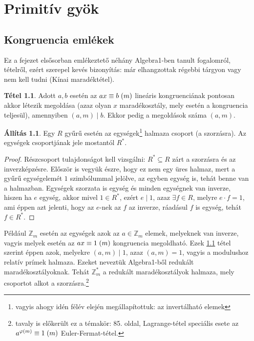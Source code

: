 \documentclass[12pt]{book}
\theoremstyle{plain} %
\theoremstyle{definition} %
\newtheorem{all/}{Állítás}[section]
\newenvironment{all}
{\renewcommand{\qedsymbol}{$\clubsuit$}%
	\pushQED{\qed}\begin{all/}}
	{\popQED\end{all/}}
\newtheorem{theo/}{Tétel}[section]
\newenvironment{theo}
  {\renewcommand{\qedsymbol}{$\clubsuit$}%
   \pushQED{\qed}\begin{theo/}}
  {\popQED\end{theo/}}
\theoremstyle{remark}
\renewcommand\qedsymbol{$\blacksquare$}
\numberwithin{equation}{section}  %
\begin{document}
	\chapter{Primitív gyök}
	\section{Kongruencia emlékek}\label{kongruencia_emlekek}
	Ez a fejezet elsősorban emlékeztető néhány Algebra1-ben tanult fogalomról, tételről, ezért szerepel kevés bizonyítás: már elhangzottak régebbi tárgyon vagy nem kell tudni (Kínai maradéktétel).
	
	\begin{theo}\label{linkongr}
		Adott $a,b$ esetén az $ax\equiv b \hspace{1mm} (m)$ lineáris kongruenciának pontosan akkor létezik megoldása (azaz olyan $x$ maradékosztály, mely esetén a kongruencia teljesül), amennyiben $(a,m)\mid b$. Ekkor pedig a megoldások száma $(a,m)$.
	\end{theo}

	\begin{all}
		Egy $R$ gyűrű esetén az egységek\footnote{vagyis ahogy idén félév elején megállapítottuk: az invertálható elemek} halmaza csoport (a szorzásra). Az egységek csoportjának jele mostantól $R^{*}$.
	\end{all}

	\begin{proof}
		Részcsoport tulajdonságot kell vizsgálni: $R^{*}\subseteq R$ zárt a szorzásra és az inverzképzésre. Először is vegyük észre, hogy ez nem egy üres halmaz, mert a gyűrű egységelemét $1$ szimbólummal jelölve, az egyben egység is, tehát benne van a halmazban. Egységek szorzata is egység és minden egységnek van inverze, hiszen ha $e$ egység, akkor mivel $1\in R^{*}$, ezért $e\mid 1$, azaz $\exists f\in R$, melyre $e\cdot f = 1$, ami éppen azt jelenti, hogy az $e$-nek az $f$ az inverze, ráadásul $f$ is egység, tehát $f\in R^{*}$.
		
	\end{proof}
	Például $\mathbb{Z}_m$ esetén az egységek azok az $a\in \mathbb{Z}_m$ elemek, melyeknek van inverze, vagyis melyek esetén az $ax\equiv 1 \hspace{1mm} (m)$ kongruencia megoldható. Ezek \ref{linkongr} tétel szerint éppen azok, melyekre $(a,m)\mid 1$, azaz $(a,m)=1$, vagyis a modulushoz relatív prímek halmaza. Ezeket neveztük Algebra1-ből redukált maradékosztályoknak. Tehát $\mathbb{Z}_m^{*}$ a redukált maradékosztályok halmaza, mely csoportot alkot a szorzásra.\footnote{tavaly is előkerült ez a témakör: 85. oldal, Lagrange-tétel speciális esete az $a^{\varphi(m)}\equiv 1 \hspace{1mm} (m)$ Euler-Fermat-tétel.}
	
\end{document}
